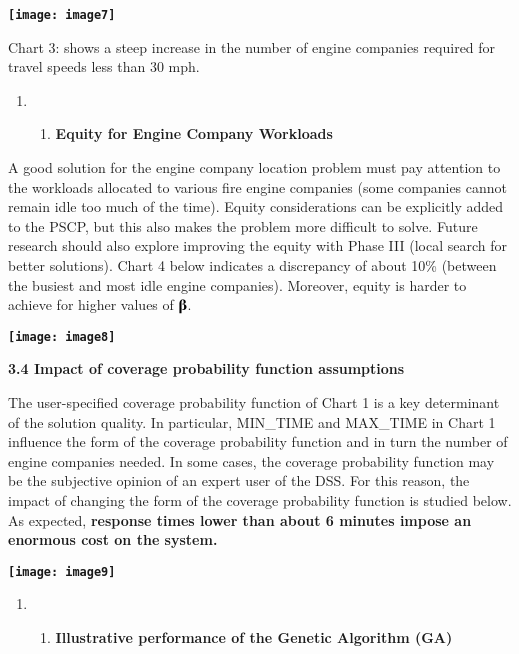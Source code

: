 \documentclass{article} %
\begin{document}
\noindent \textbf{\texttt{[image: image7]}}

\noindent Chart 3: shows a steep increase in the number of engine companies required for travel speeds less than 30 mph.  

\noindent \textbf{}

\begin{enumerate}
\item \begin{enumerate}
\item \textbf{ Equity for Engine Company Workloads}
\end{enumerate}
\end{enumerate}

\noindent A good solution for the engine company location problem must pay attention to the workloads allocated to various fire engine companies (some companies cannot remain idle too much of the time).  Equity considerations can be explicitly added to the PSCP, but this also makes the problem more difficult to solve.  Future research should also explore improving the equity with Phase III (local search for better solutions).  Chart 4 below indicates a discrepancy of about 10\% (between the busiest and most idle engine companies).  Moreover, equity is harder to achieve for higher values of  \textbf{$\boldsymbol{\betaup}$}.

\noindent \textbf{\texttt{[image: image8]}}

\noindent \textbf{}

\noindent \textbf{3.4 Impact of coverage probability function assumptions}

\noindent The user-specified coverage probability function of Chart 1 is a key determinant of the solution quality.  In particular, MIN\_TIME and MAX\_TIME in Chart 1 influence the form of the coverage probability function and in turn the number of engine companies needed.  In some cases, the coverage probability function may be the subjective opinion of an expert user of the DSS.  For this reason, the impact of changing the form of the coverage probability function is studied below.  As expected, \textbf{response times lower than about 6 minutes impose an enormous cost on the system.}

\noindent \textbf{\texttt{[image: image9]}}

\noindent \textbf{}

\begin{enumerate}
\item \begin{enumerate}
\item \textbf{ Illustrative performance of the Genetic Algorithm (GA)}
\end{enumerate}
\end{enumerate}
\end{document}
